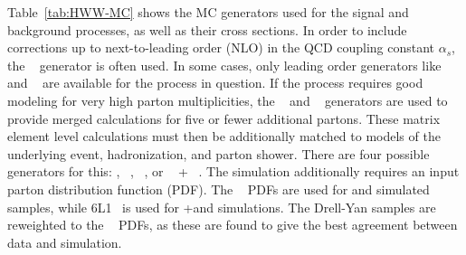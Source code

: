 Table~\ref{tab:HWW-MC} shows the MC generators used for the signal and background processes, as well as their cross sections. In order to include corrections up to next-to-leading order (NLO) in the QCD coupling constant $\alpha_{s}$, the \POWHEG~\cite{powheg1} generator is often used. In some cases, only leading order generators like \ACERMC~\cite{acermc} and \GGTOVV~\cite{gg2vv} are available for the process in question. If the process requires good modeling for very high parton multiplicities, the \SHERPA~\cite{sherpa} and \ALPGEN~\cite{alpgen} generators are used to provide merged calculations for five or fewer additional partons. These matrix element level calculations must then be additionally matched to models of the underlying event, hadronization, and parton shower. There are four possible generators for this: \SHERPA, ~\cite{pythia6}, ~\cite{pythia8}, or \HERWIG~\cite{herwig} + \JIMMY~\cite{jimmy}. The simulation additionally requires an input parton distribution function (PDF). The ~\cite{ct10} PDFs are used for \SHERPA and \POWHEG simulated samples, while \CTEQ6L1~\cite{cteq} is used for \ALPGEN+\HERWIG and \ACERMC simulations. The Drell-Yan samples are reweighted to the \MRST~\cite{mrst} PDFs, as these are found to give the best agreement between data and simulation. 

